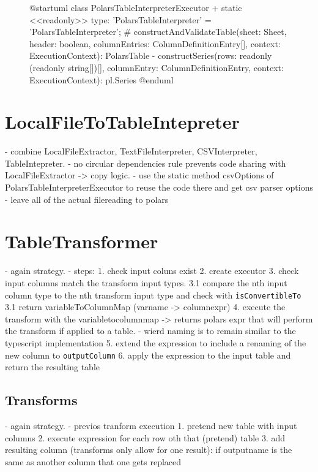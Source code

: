 \begin{figure}
	\begin{plantuml}
		@startuml
		class PolarsTableInterpreterExecutor {
		+ {static} <<readonly>> type: 'PolarsTableInterpreter' = 'PolarsTableInterpreter';
		# constructAndValidateTable(sheet: Sheet, header: boolean, columnEntries: ColumnDefinitionEntry[], context: ExecutionContext): PolarsTable
		- constructSeries(rows: readonly (readonly string[])[], columnEntry: ColumnDefinitionEntry, context: ExecutionContext): pl.Series
		}
		@enduml
	\end{plantuml}
	\caption{}\label{fig:polarstableinterpreter_uml}
\end{figure}


\section{LocalFileToTableIntepreter}
- combine LocalFileExtractor, TextFileInterpreter, CSVInterpreter, TableIntepreter.
- no circular dependencies rule prevents code sharing with LocalFileExtractor -> copy logic.
- use the static method csvOptions of PolarsTableInterpreterExecutor to reuse the code there and get csv parser options
- leave all of the actual filereading to polars


\section{TableTransformer}
- again strategy.
- steps:
1. check input coluns exist
2. create executor
3. check input columns match the transform input types.
3.1 compare the nth input column type to the nth transform input type and check with \Verb|isConvertibleTo|
3.1 return variableToColumnMap (varname -> columnexpr)
4. execute the transform with the variabletocolumnmap -> returns polars expr that will perform the transform if applied to a table.
- wierd naming is to remain similar to the typescript implementation
5. extend the expression to include a renaming of the new column to \Verb|outputColumn|
6. apply the expression to the input table and return the resulting table

\subsection{Transforms}
- again strategy.
- previos tranform execution
1. pretend new table with input columns
2. execute expression for each row oth that (pretend) table
3. add resulting column (transforms only allow for one result): if outputname is the same as another column that one gets replaced


